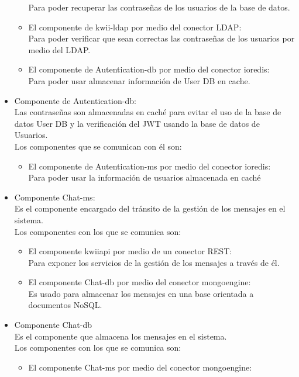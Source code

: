 \begin{itemize}
\begin{itemize}
        Para poder recuperar las contraseñas de los usuarios de la base de datos.
        \item El componente de kwii-ldap por medio del conector LDAP:\\
        Para poder verificar que sean correctas las contraseñas de los usuarios por medio del LDAP.
        \item El componente de Autentication-db por medio del conector ioredis:\\
        Para poder usar almacenar información de User DB en cache.
    \end{itemize}
    \item Componente de Autentication-db:\\
     Las contraseñas son almacenadas en caché para evitar el uso de la base de datos User DB y la verificación del JWT usando la base de datos de Usuarios.\\
     Los componentes que se comunican con él son:
     \begin{itemize}
        \item El componente de Autentication-ms por medio del conector ioredis:\\
        Para poder usar la información de usuarios almacenada en caché
    \end{itemize}
    \item Componente Chat-ms:\\
    Es el componente encargado del tránsito de la gestión de los mensajes en el sistema.\\
    Los componentes con los que se comunica son:
    \begin{itemize}
        \item El componente kwii\textunderscore api por medio de un conector REST:\\
        Para exponer los servicios de la gestión de los mensajes a través de él.
        \item El componente Chat-db por medio del conector mongoengine:\\
        Es usado para almacenar los mensajes en una base orientada a documentos NoSQL.
    \end{itemize}
    \item Componente Chat-db\\
    Es el componente que almacena los mensajes en el sistema.\\
    Los componentes con los que se comunica son:
    \begin{itemize}
        \item El componente Chat-ms por medio del conector mongoengine:\\

\end{itemize}
\end{itemize}
